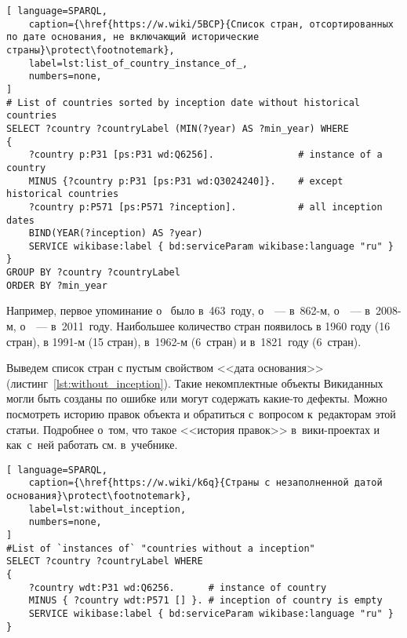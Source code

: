 \begin{lstlisting}[ language=SPARQL, 
    caption={\href{https://w.wiki/5BCP}{Список стран, отсортированных по дате основания, не включающий исторические страны}\protect\footnotemark},
    label=lst:list_of_country_instance_of_, 
    numbers=none,
]
# List of countries sorted by inception date without historical countries
SELECT ?country ?countryLabel (MIN(?year) AS ?min_year) WHERE
{
	?country p:P31 [ps:P31 wd:Q6256].               # instance of a country 
	MINUS {?country p:P31 [ps:P31 wd:Q3024240]}.    # except historical countries
	?country p:P571 [ps:P571 ?inception].           # all inception dates
	BIND(YEAR(?inception) AS ?year)
	SERVICE wikibase:label { bd:serviceParam wikibase:language "ru" }
}
GROUP BY ?country ?countryLabel
ORDER BY ?min_year
\end{lstlisting}


Например, первое упоминание о~ было в~463~году, 
о~~--- в~862-м, 
о~~--- в~2008-м, 
о~~--- в~2011~году. 
Наибольшее количество стран появилось в 1960 году (16 стран), 
в 1991-м (15 стран), в~1962-м (6~стран) и в~1821~году (6~стран).


\newpage
Выведем список стран с пустым свойством <<дата основания>> (листинг~\ref{lst:without_inception}). 
Такие некомплектные объекты Викиданных могли быть созданы по ошибке или могут содержать какие-то дефекты. 
Можно посмотреть историю правок объекта и обратиться с~вопросом к~редакторам этой статьи. 
Подробнее о~том, что такое <<история правок>> в~вики-проектах 
и как~с~ней работать см. в~учебнике.

\begin{lstlisting}[ language=SPARQL, 
    caption={\href{https://w.wiki/k6q}{Страны с незаполненной датой основания}\protect\footnotemark},
    label=lst:without_inception,
    numbers=none,
]
#List of `instances of` "countries without a inception" 
SELECT ?country ?countryLabel WHERE
{
    ?country wdt:P31 wd:Q6256.      # instance of country
    MINUS { ?country wdt:P571 [] }. # inception of country is empty
    SERVICE wikibase:label { bd:serviceParam wikibase:language "ru" }
}
\end{lstlisting}




